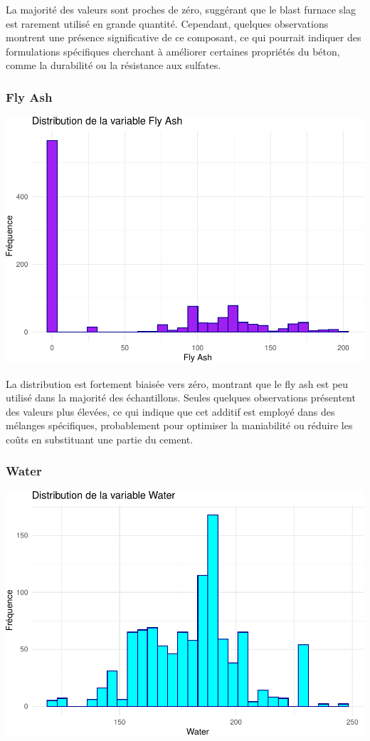 \documentclass[
  12pt,
]{article}
\begin{document}
La majorité des valeurs sont proches de zéro, suggérant que le blast
furnace slag est rarement utilisé en grande quantité. Cependant,
quelques observations montrent une présence significative de ce
composant, ce qui pourrait indiquer des formulations spécifiques
cherchant à améliorer certaines propriétés du béton, comme la durabilité
ou la résistance aux sulfates.

\subsubsection{Fly Ash}\label{fly-ash}

\includegraphics{rmd_final_files/figure-latex/unnamed-chunk-3-1.pdf}

La distribution est fortement biaisée vers zéro, montrant que le fly ash
est peu utilisé dans la majorité des échantillons. Seules quelques
observations présentent des valeurs plus élevées, ce qui indique que cet
additif est employé dans des mélanges spécifiques, probablement pour
optimiser la maniabilité ou réduire les coûts en substituant une partie
du cement.

\subsubsection{Water}\label{water}

\includegraphics{rmd_final_files/figure-latex/unnamed-chunk-4-1.pdf}
\end{document}
